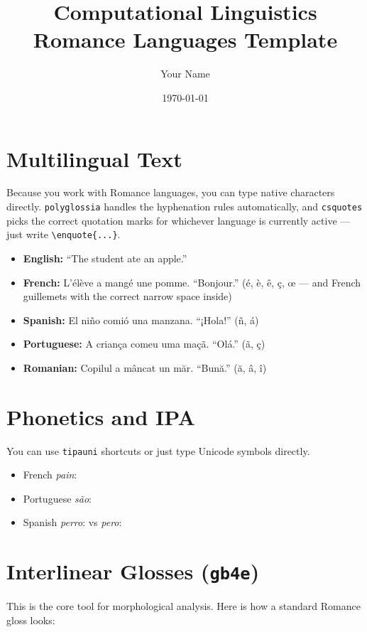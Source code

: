 \documentclass[11pt,a4paper]{article}
\title{Computational Linguistics \\ \large Romance Languages Template}
\author{Your Name}
\date{\today}
\begin{document}
\maketitle

\section{Multilingual Text}
Because you work with Romance languages, you can type native characters
directly. \texttt{polyglossia} handles the hyphenation rules automatically,
and \texttt{csquotes} picks the correct quotation marks for whichever
language is currently active --- just write \verb|\enquote{...}|.

\begin{itemize}
    \item \textbf{English:} \enquote{The student ate an apple.}
    \item \textbf{French:} \textfrench{L'élève a mangé une pomme. \enquote{Bonjour.}} (é, è, ê, ç, œ --- and French guillemets with the correct narrow space inside)
    \item \textbf{Spanish:} \textspanish{El niño comió una manzana. \enquote{¡Hola!}} (ñ, á)
    \item \textbf{Portuguese:} \textportuguese{A criança comeu uma maçã. \enquote{Olá.}} (ã, ç)
    \item \textbf{Romanian:} \textromanian{Copilul a mâncat un măr. \enquote{Bună.}} (ă, â, î)
\end{itemize}

\section{Phonetics and IPA}
You can use \texttt{tipauni} shortcuts or just type Unicode symbols directly. 
\begin{itemize}
    \item French \textit{pain}: \textipa{[pɛ̃]}
    \item Portuguese \textit{são}: \textipa{[sɐ̃w̃]}
    \item Spanish \textit{perro}: \textipa{[pero]} vs \textit{pero}: \textipa{[peɾo]}
\end{itemize}

\section{Interlinear Glosses (\texttt{gb4e})}
This is the core tool for morphological analysis. Here is how a standard Romance gloss looks:
\end{document}
